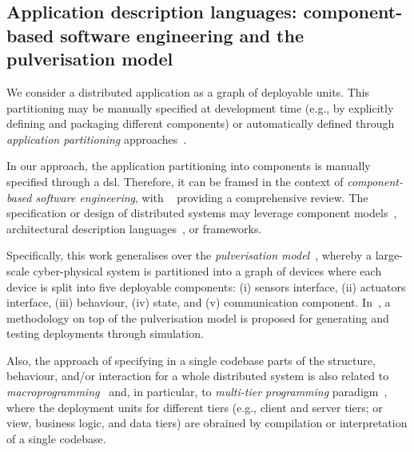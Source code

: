 \documentclass[conference]{IEEEtran}
\begin{document}
\subsection{Application description languages: component-based software engineering and the pulverisation model}
\label{sec:rw:whatsw}
%
%
We consider a distributed application 
 as a graph of deployable units.
%
This partitioning may be 
 manually specified at development time
 (e.g., by explicitly defining and packaging different components)
 or automatically defined
 through \emph{application partitioning} approaches~\cite{DBLP:journals/jnca/LiuASGBQ15}. %
 
In our approach, the application partitioning into components is manually specified through a \ac{dsl}.
%
Therefore, it can be framed in the context of \emph{component-based software engineering},
 with ~\cite{vale2016component-based-se} providing a comprehensive review.
%
The specification or design of distributed systems
 may leverage
 component models~\cite{DBLP:journals/tse/CrnkovicSVC11},
 architectural description languages~\cite{DBLP:journals/tse/MedvidovicT00},
 or frameworks.
%

Specifically,
 this work generalises over the \emph{pulverisation model}~\cite{FI2020-pulverization,IEEE-IoTJ-pulverization-simulation},
 whereby a large-scale cyber-physical system
 is partitioned into a graph of devices
 where each device is split into five deployable components:
 (i) sensors interface, 
 (ii) actuators interface, 
 (iii) behaviour, 
 (iv) state, and 
 (v) communication component.
%
In~\cite{IEEE-IoTJ-pulverization-simulation},
 a methodology on top of the pulverisation model
 is proposed
 for generating and testing deployments through simulation.

Also,
 the approach of specifying in a single codebase 
 parts of the structure, behaviour, and/or interaction 
 for a whole distributed system
 is also related to \emph{macroprogramming}~\cite{Casadei2023macro}
 and, in particular, to \emph{multi-tier programming} paradigm~\cite{DBLP:journals/csur/WeisenburgerWS20},
 where the deployment units for different tiers (e.g., client and server tiers; or view, business logic, and data tiers) are obrained by compilation or interpretation of a single codebase.
\end{document}
